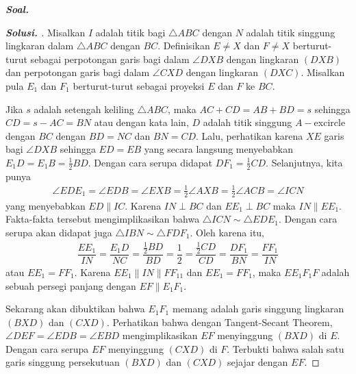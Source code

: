 \textbf{\textit{Soal. }}

\begin{proof}[\textbf{Solusi.  }] Misalkan $I$ adalah titik bagi $\triangle ABC$ dengan $N$ adalah titik singgung lingkaran dalam $\triangle ABC$ dengan $BC$. Definisikan $E \neq X$ dan $F \neq X$ berturut-turut sebagai perpotongan garis bagi dalam $\angle DXB$ dengan lingkaran $(DXB)$ dan perpotongan garis bagi dalam $\angle CXD$ dengan lingkaran $(DXC)$. Misalkan pula $E_1$ dan $F_1$ berturut-turut sebagai proyeksi $E$ dan $F$ ke $BC$.
% 

Jika $s$ adalah setengah keliling $\triangle ABC$, maka $AC+CD=AB+BD=s$ sehingga $CD = s-AC=BN$ atau dengan kata lain, $D$ adalah titik singgung $A-$excircle dengan $BC$ dengan $BD=NC$ dan $BN=CD$.
Lalu, perhatikan karena $XE$ garis bagi $\angle DXB$ sehingga $ED=EB$ yang secara langsung menyebabkan $E_1D=E_1B=\frac{1}{2}BD$. Dengan cara serupa didapat $DF_1=\frac{1}{2}CD$. 
Selanjutnya, kita punya
\begin{align*}
    \angle EDE_1 = \angle EDB = \angle EXB = \frac{1}{2}\angle AXB = \frac{1}{2}\angle ACB = \angle ICN 
\end{align*}
yang menyebabkan $ED \parallel IC$. Karena $IN \perp BC$ dan $EE_1 \perp BC$ maka $IN \parallel EE_1$. Fakta-fakta tersebut mengimplikasikan bahwa $\triangle ICN \sim \triangle EDE_1$. Dengan cara serupa akan didapat juga $\triangle IBN \sim \triangle FDF_1$.
Oleh karena itu,
\begin{align*}
    \dfrac{EE_1}{IN} = \dfrac{E_1D}{NC} = \dfrac{\frac{1}{2}BD}{BD}=\dfrac{1}{2}=\dfrac{\frac{1}{2}CD}{CD}= \dfrac{DF_1}{BN} = \dfrac{FF_1}{IN}
\end{align*}
atau $EE_1=FF_1$. Karena $EE_1 \parallel IN \parallel FF_11$ dan $EE_1=FF_1$, maka $EE_1F_1F$ adalah sebuah persegi panjang dengan $EF \parallel E_1F_1$.

Sekarang akan dibuktikan bahwa $E_1F_1$ memang adalah garis singgung lingkaran $(BXD)$ dan $(CXD)$. Perhatikan bahwa dengan Tangent-Secant Theorem, $\angle DEF=\angle EDB=\angle EBD$ mengimplikasikan $EF$ menyinggung $(BXD)$ di $E$. Dengan cara serupa $EF$ menyinggung $(CXD)$ di $F$. Terbukti bahwa salah satu garis singgung persekutuan $(BXD)$ dan $(CXD)$ sejajar dengan $EF$.

\end{proof}